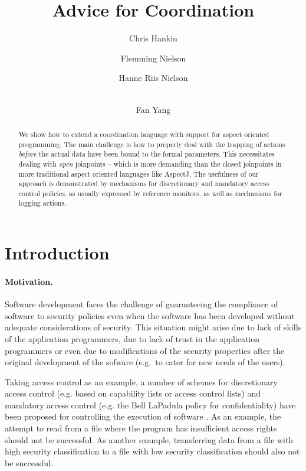 \documentclass[a4paper]{llncs}
\title{Advice for Coordination}
\begin{document}
\author{%
      Chris Hankin
      \and
      Flemming Nielson
      \and
      Hanne Riis Nielson
      \and\\
      Fan Yang
  }
\maketitle


\begin{abstract}
We show how to extend a coordination language with support for aspect
oriented programming. The main challenge is how to properly deal with
the trapping of actions \emph{before} the actual data have been bound
to the formal parameters.  This necessitates dealing with \emph{open}
joinpoints -- which is more demanding than the closed joinpoints in
more traditional aspect oriented languages like AspectJ. The
usefulness of our approach is demonstrated by mechanisms for
discretionary and mandatory access control policies, as usually
expressed by reference monitors, as well as mechanisms for logging
actions.
\end{abstract}


\section{Introduction}\label{sec:intro}

\paragraph{Motivation.}
Software development faces the challenge of guaranteeing the
compliance of software to security policies even when the software has
been developed without adequate considerations of security.  This
situation might arise due to lack of skills of the application
programmers, due to lack of trust in the application programmers or
even due to modifications of the security properties after the
original development of the sofware (e.g.~to cater for new needs of
the users).

Taking access control as an example, a number of schemes for
discretionary access control (e.g. based on capability lists or access
control lists) and mandatory access control (e.g. the Bell LaPadula
policy for confidentiality) have been proposed for controlling the
execution of software \cite{Gollmann}.  As an example, the attempt to
read from a file where the program has insufficient access rights
should not be successful.  As another example, transferring data from
a file with high security classification to a file with low security
classification should also not be successful.
\end{document}
